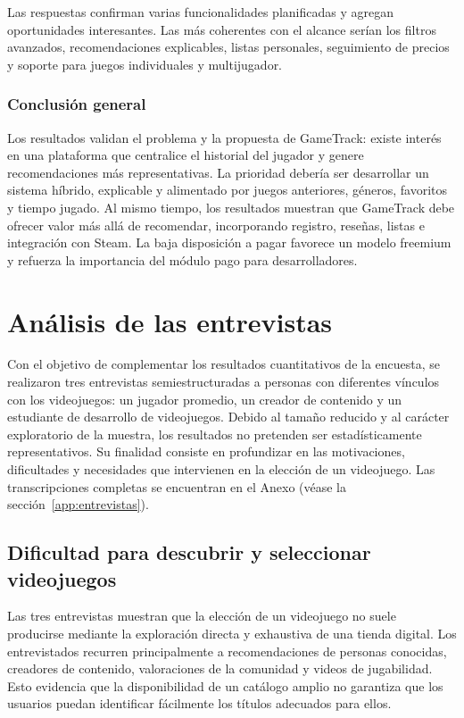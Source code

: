 Las respuestas confirman varias funcionalidades planificadas y agregan oportunidades interesantes. Las más coherentes con el alcance serían los filtros avanzados, recomendaciones explicables, listas personales, seguimiento de precios y soporte para juegos individuales y multijugador.

\subsubsection*{Conclusión general}

Los resultados validan el problema y la propuesta de GameTrack: existe interés en una plataforma que centralice el historial del jugador y genere recomendaciones más representativas. La prioridad debería ser desarrollar un sistema híbrido, explicable y alimentado por juegos anteriores, géneros, favoritos y tiempo jugado. Al mismo tiempo, los resultados muestran que GameTrack debe ofrecer valor más allá de recomendar, incorporando registro, reseñas, listas e integración con Steam. La baja disposición a pagar favorece un modelo freemium y refuerza la importancia del módulo pago para desarrolladores.

\section{Análisis de las entrevistas}\label{sec:analisis_entrevistas}

Con el objetivo de complementar los resultados cuantitativos de la encuesta, se realizaron tres entrevistas semiestructuradas a personas con diferentes vínculos con los videojuegos: un jugador promedio, un creador de contenido y un estudiante de desarrollo de videojuegos. Debido al tamaño reducido y al carácter exploratorio de la muestra, los resultados no pretenden ser estadísticamente representativos. Su finalidad consiste en profundizar en las motivaciones, dificultades y necesidades que intervienen en la elección de un videojuego. Las transcripciones completas se encuentran en el Anexo (véase la sección~\ref{app:entrevistas}).

\subsection{Dificultad para descubrir y seleccionar videojuegos}\label{subsec:dificultad_descubrir}

Las tres entrevistas muestran que la elección de un videojuego no suele producirse mediante la exploración directa y exhaustiva de una tienda digital. Los entrevistados recurren principalmente a recomendaciones de personas conocidas, creadores de contenido, valoraciones de la comunidad y videos de jugabilidad. Esto evidencia que la disponibilidad de un catálogo amplio no garantiza que los usuarios puedan identificar fácilmente los títulos adecuados para ellos.

